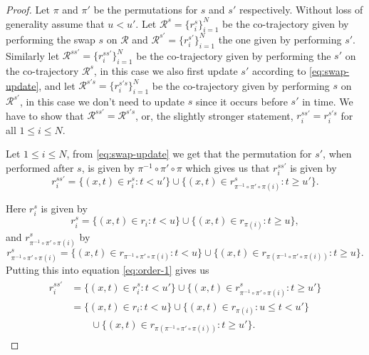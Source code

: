 \documentclass[12pt]{article}
\newcommand{\traj}{r}
\newcommand{\cotraj}{\mathcal{R}}
\newcommand{\swap}{s}
\newcommand{\swaptime}{u}
\theoremstyle{definition}
\begin{document}
\begin{proof}
  Let \(\pi\) and \(\pi'\) be the permutations for \(\swap\) and
  \(\swap'\) respectively. Without loss of generality assume that
  \(\swaptime < \swaptime'\). Let
  \(\cotraj^{\swap} = \{\traj^{\swap}_{i}\}_{i = 1}^{N}\) be the
  co-trajectory given by performing the swap \(\swap\) on \(\cotraj\)
  and \(\cotraj^{\swap'} = \{\traj^{\swap'}_{i}\}_{i = 1}^{N}\) the
  one given by performing \(\swap'\). Similarly let
  \(\cotraj^{\swap\swap'} = \{\traj^{\swap\swap'}_{i}\}_{i = 1}^{N}\)
  be the co-trajectory given by performing the \(\swap'\) on the
  co-trajectory \(\cotraj^{\swap}\), in this case we also first update
  \(\swap'\) according to \ref{eq:swap-update}, and let
  \(\cotraj^{\swap'\swap} = \{\traj^{\swap'\swap}_{i}\}_{i = 1}^{N}\)
  be the co-trajectory given by performing \(\swap\) on
  \(\cotraj^{\swap'}\), in this case we don't need to update \(\swap\)
  since it occurs before \(\swap'\) in time. We have to show that
  \(\cotraj^{\swap\swap'} = \cotraj^{\swap'\swap}\), or, the slightly
  stronger statement,
  \(\traj_{i}^{\swap\swap'} = \traj_{i}^{\swap'\swap}\) for all
  \(1 \leq i \leq N\).

  Let \(1 \leq i \leq N\), from \ref{eq:swap-update} we get that the
  permutation for \(\swap'\), when performed after \(\swap\), is given
  by \(\pi^{-1} \circ \pi' \circ \pi\) which gives us that
  \(\traj^{\swap\swap'}_{i}\) is given by
  \begin{equation}
    \label{eq:order-1}
    \traj^{\swap\swap'}_{i} = \{(x, t) \in \traj^{\swap}_{i}: t < u'\}
    \cup \{(x, t) \in \traj^{\swap}_{\pi^{-1} \circ \pi' \circ \pi(i)}: t \geq u'\}.
  \end{equation}

  Here \(\traj^{\swap}_{i}\) is given by
  \begin{equation*}
    \traj^{\swap}_{i} = \{(x, t) \in \traj_{i}: t < u\}
    \cup \{(x, t) \in \traj_{\pi(i)}: t \geq u\},
  \end{equation*}
  and \(\traj^{\swap}_{\pi^{-1} \circ \pi' \circ \pi(i)}\) by
  \begin{equation*}
    \traj^{\swap}_{\pi^{-1} \circ \pi' \circ \pi(i)} = \{(x, t) \in \traj_{\pi^{-1} \circ \pi' \circ \pi(i)}: t < u\}
    \cup \{(x, t) \in \traj_{\pi(\pi^{-1} \circ \pi' \circ \pi(i))}: t \geq u\}.
  \end{equation*}
  Putting this into equation \ref{eq:order-1} gives us
  \begin{align}
    \begin{split}
      \label{eq:order-1-final}
      \traj^{\swap\swap'}_{i} &= \{(x, t) \in \traj^{\swap}_{i}: t < u'\}
      \cup \{(x, t) \in \traj^{\swap}_{\pi^{-1} \circ \pi' \circ \pi(i)}: t \geq u'\}\\
      &= \{(x, t) \in \traj_{i}: t < u\}
      \cup \{(x, t) \in \traj_{\pi(i)}: u \leq t < u'\}\\
      &\qquad \cup \{(x, t) \in \traj_{\pi(\pi^{-1} \circ \pi' \circ \pi(i))}: t \geq u'\}.
    \end{split}
  \end{align}


\end{proof}
\end{document}
